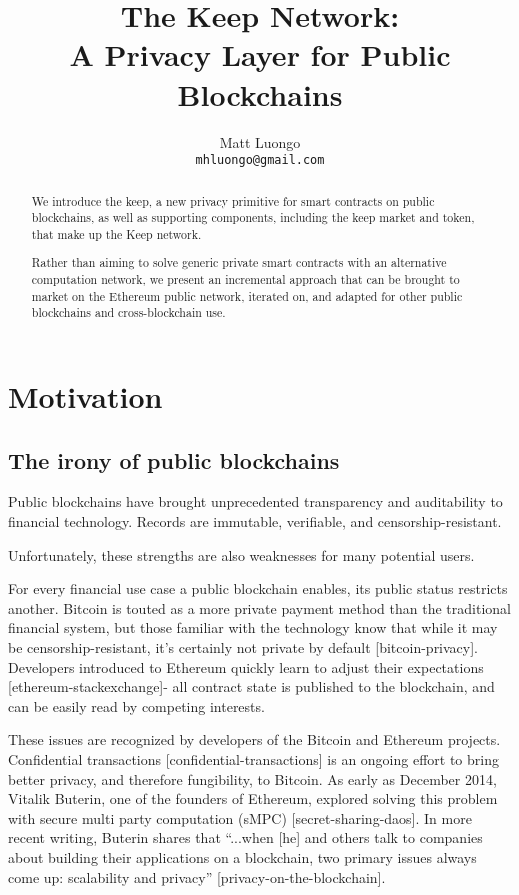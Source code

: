 \documentclass[11pt]{article}
\title{The Keep Network:\protect\\A Privacy Layer for Public Blockchains}
\author{Matt Luongo \\
  {\tt mhluongo@gmail.com}}
\date{}
\begin{document}
 \maketitle \begin{abstract}

  We introduce the keep, a new privacy primitive for smart contracts
  on public blockchains, as well as supporting components, including
  the keep market and token, that make up the Keep network.

  Rather than aiming to solve generic private smart contracts with an
  alternative computation network, we present an incremental approach
  that can be brought to market on the Ethereum public network,
  iterated on, and adapted for other public blockchains and
  cross-blockchain use.
\end{abstract}

\section{Motivation}

\subsection{The irony of public blockchains}

Public blockchains have brought unprecedented transparency and
auditability to financial technology. Records are immutable,
verifiable, and censorship-resistant.

Unfortunately, these strengths are also weaknesses for many potential
users.

For every financial use case a public blockchain enables, its public
status restricts another. Bitcoin is touted as a more private payment
method than the traditional financial system, but those familiar with
the technology know that while it may be censorship-resistant, it’s
certainly not private by default [bitcoin-privacy]. Developers
introduced to Ethereum quickly learn to adjust their expectations
[ethereum-stackexchange]- all contract state is published to the
blockchain, and can be easily read by competing interests.

These issues are recognized by developers of the Bitcoin and Ethereum
projects. Confidential transactions [confidential-transactions] is an
ongoing effort to bring better privacy, and therefore fungibility, to
Bitcoin. As early as December 2014, Vitalik Buterin, one of the
founders of Ethereum, explored solving this problem with secure multi
party computation (sMPC) [secret-sharing-daos]. In more recent
writing, Buterin shares that “...when [he] and others talk to
companies about building their applications on a blockchain, two
primary issues always come up: scalability and privacy”
[privacy-on-the-blockchain].
\end{document}
